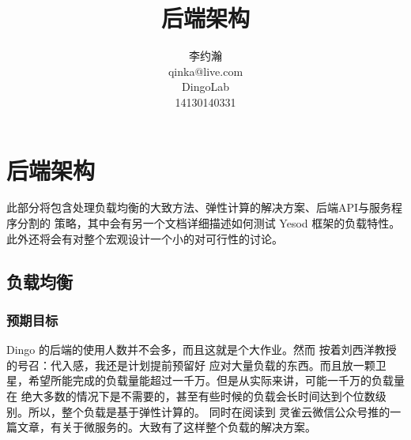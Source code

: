 







\makeatletter
\def\@NoStyleChaper{\ralex} %
\def\@ARCHDoc{\ralex} %
\def\@UsingAppendix{\ralex} %
\def\@DocType{article}
\def\@DocTypeCTEX{ctexart}
\def\primarykey#1{\colorbox[rgb]{0.9,0.7,0.65}{#1}}
\makeatother


    \makeatletter
     \newcommand{\mcite}[1]{$^{\tiny\cite{#1}}$}
     \newcommand{\mbibitem}[1]{\bibitem[#1]{#1}\addtocounter{myBib}{1}}
     \setcounter{myBib}{1}
     \makeatother

\title{后端架构}
\author{李约瀚 \\ qinka@live.com \\ DingoLab \\ 14130140331}


\maketitle
\newpage

\section{后端架构}

此部分将包含处理负载均衡的大致方法、弹性计算的解决方案、后端API与服务程序分割的
策略，其中会有另一个文档详细描述如何测试 Yesod 框架的负载特性。
此外还将会有对整个宏观设计一个小的对可行性的讨论。


\subsection{负载均衡}
\subsubsection{预期目标}
Dingo 的后端的使用人数并不会多，而且这就是个大作业。然而 按着刘西洋教授的号召：代入感，我还是计划提前预留好
应对大量负载的东西。而且放一颗卫星，希望所能完成的负载量能超过一千万。但是从实际来讲，可能一千万的负载量在
绝大多数的情况下是不需要的，甚至有些时候的负载会长时间达到个位数级别。所以，整个负载是基于弹性计算的。
同时在阅读到 灵雀云微信公众号推的一篇文章，有关于微服务的。大致有了这样整个负载的解决方案。
